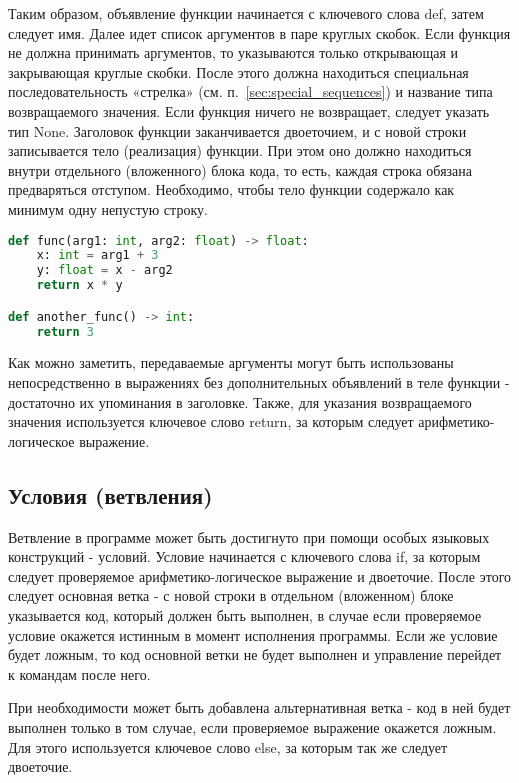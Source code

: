 Таким образом, объявление функции начинается с ключевого слова def, затем следует имя. Далее идет список аргументов в паре круглых скобок.
Если функция не должна принимать аргументов, то указываются только открывающая и закрывающая круглые скобки.
После этого должна находиться специальная последовательность «стрелка» (см. п.~\ref{sec:special_sequences}) и название типа возвращаемого значения.
Если функция ничего не возвращает, следует указать тип None.
Заголовок функции заканчивается двоеточием, и с новой строки записывается тело (реализация) функции.
При этом оно должно находиться внутри отдельного (вложенного) блока кода, то есть, каждая строка обязана предваряться отступом.
Необходимо, чтобы тело функции содержало как минимум одну непустую строку.

\begin{lstlisting}[language=Python, caption=Примеры объявлений функций]
def func(arg1: int, arg2: float) -> float:
    x: int = arg1 + 3
    y: float = x - arg2
    return x * y

def another_func() -> int:
    return 3
\end{lstlisting}

Как можно заметить, передаваемые аргументы могут быть использованы непосредственно в выражениях без дополнительных объявлений в теле функции - достаточно их упоминания в заголовке.
Также, для указания возвращаемого значения используется ключевое слово return, за которым следует арифметико-логическое выражение.

\subsection{Условия (ветвления)}

Ветвление в программе может быть достигнуто при помощи особых языковых конструкций - условий.
Условие начинается с ключевого слова if, за которым следует проверяемое арифметико-логическое выражение и двоеточие.
После этого следует основная ветка - с новой строки в отдельном (вложенном) блоке указывается код, который должен быть выполнен, в случае если проверяемое условие окажется истинным в момент исполнения программы.
Если же условие будет ложным, то код основной ветки не будет выполнен и управление перейдет к командам после него.

При необходимости может быть добавлена альтернативная ветка - код в ней будет выполнен только в том случае, если проверяемое выражение окажется ложным.
Для этого используется ключевое слово else, за которым так же следует двоеточие.

